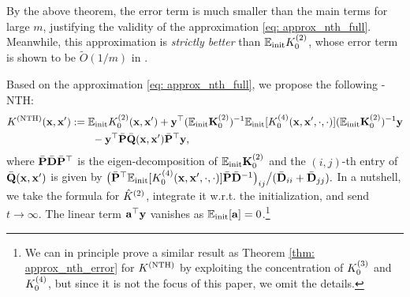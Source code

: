 By the above theorem, the error term is much smaller than the main terms for large $m$, justifying the validity of the approximation \eqref{eq: approx_nth_full}. Meanwhile, this approximation is \emph{strictly better} than ${\mathbb{E}}_{\textnormal{init}} {K}^{(2)}_0$, whose error term is shown to be $\tilde O(1/m)$ in \cite{huang2019dynamics}.

Based on the approximation \eqref{eq: approx_nth_full}, we propose the following \lantk-NTH:
\begin{align}
	K^{(\textnormal{NTH})}({\mathbf{x}}, {\mathbf{x}}') &:= {\mathbb{E}}_{\textnormal{init}} {K}^{(2)}_0({\mathbf{x}}, {\mathbf{x}}') + {\mathbf{y}}^\top (\mathbb{E}_{\textnormal{init}}{{\mathbf{K}}}^{(2)}_0)^{-1} \mathbb{E}_{\textnormal{init}}[{K}^{(4)}_0({\mathbf{x}}, {\mathbf{x}}', \cdot, \cdot)] (\mathbb{E}_{\textnormal{init}}{{\mathbf{K}}}^{(2)}_0)^{-1} {\mathbf{y}} \nonumber\\
	\label{eq: approx_nth_kernel}
	& \qquad - {\mathbf{y}}^\top \bar{{\mathbf{P}}}\bar{{\mathbf{Q}}}({\mathbf{x}}, {\mathbf{x}}')\bar{{\mathbf{P}}}^\top {\mathbf{y}},
\end{align}
where $\bar {{\mathbf{P}}}\bar {{\mathbf{D}}}\bar {{\mathbf{P}}}^\top$ is the eigen-decomposition of ${\mathbb{E}}_{\textnormal{init}} {\mathbf{K}}_0^{(2)}$ and the $(i, j)$-th entry of $\bar{{\mathbf{Q}}}({\mathbf{x}}, {\mathbf{x}}')$ is given by ${\bigl(\bar{{\mathbf{P}}}^\top {\mathbb{E}}_{\textnormal{init}}[{K}^{(4)}_0({\mathbf{x}}, {\mathbf{x}}', \cdot, \cdot)] \bar{{\mathbf{P}}} \bar{{\mathbf{D}}}^{-1}\bigr)_{ij}}\bigr/({\bar{{\mathbf{D}}}_{ii} + \bar{{\mathbf{D}}}_{jj}}).$ 
In a nutshell, we take the formula for ${\hat{K}}^{(2)}$, integrate it w.r.t. the initialization, and send $t\to \infty$. The linear term ${\mathbf{a}}^\top {\mathbf{y}}$ vanishes as ${\mathbb{E}}_{\textnormal{init}} [{\mathbf{a}}] = 0$.\footnote{We can in principle prove a similar result as Theorem \ref{thm: approx_nth_error} for $K^{(\textnormal{NTH})}$ by exploiting the concentration of ${K}^{(3)}_0$ and ${K}^{(4)}_0$, but since it is not the focus of this paper, we omit the details.}







